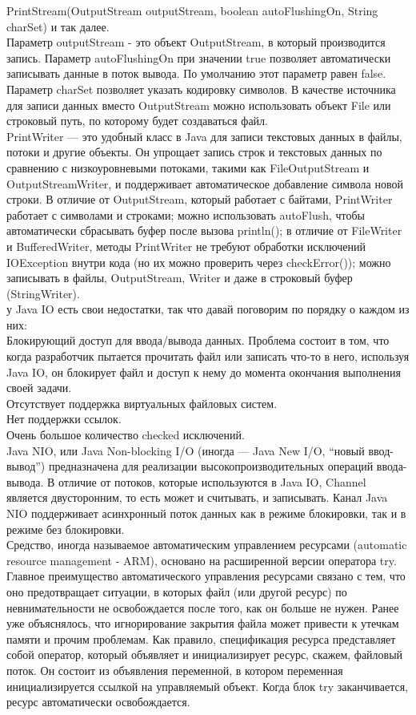 PrintStream(OutputStream outputStream, boolean autoFlushingOn, String charSet) и так далее. \\
Параметр outputStream - это объект OutputStream, в который производится запись. Параметр autoFlushingOn при значении true позволяет автоматически записывать данные в поток вывода. По умолчанию этот параметр равен false. Параметр charSet позволяет указать кодировку символов. В качестве источника для записи данных вместо OutputStream можно использовать объект File или строковый путь, по которому будет создаваться файл. \\
PrintWriter — это удобный класс в Java для записи текстовых данных в файлы, потоки и другие объекты. Он упрощает запись строк и текстовых данных по сравнению с низкоуровневыми потоками, такими как FileOutputStream и OutputStreamWriter, и поддерживает автоматическое добавление символа новой строки. В отличие от OutputStream, который работает с байтами, PrintWriter работает с символами и строками; можно использовать autoFlush, чтобы автоматически сбрасывать буфер после вызова println(); в отличие от FileWriter и BufferedWriter, методы PrintWriter не требуют обработки исключений IOException внутри кода (но их можно проверить через checkError()); можно записывать в файлы, OutputStream, Writer и даже в строковый буфер (StringWriter). \\
у Java IO есть свои недостатки, так что давай поговорим по порядку о каждом из них: \\
Блокирующий доступ для ввода/вывода данных. Проблема состоит в том, что когда разработчик пытается прочитать файл или записать что-то в него, используя Java IO, он блокирует файл и доступ к нему до момента окончания выполнения своей задачи. \\
Отсутствует поддержка виртуальных файловых систем. \\
Нет поддержки ссылок. \\
Очень большое количество checked исключений. \\
Java NIO, или Java Non-blocking I/O (иногда — Java New I/O, “новый ввод-вывод”) предназначена для реализации высокопроизводительных операций ввода-вывода. В отличие от потоков, которые используются в Java IO, Channel является двусторонним, то есть может и считывать, и записывать. Канал Java NIO поддерживает асинхронный поток данных как в режиме блокировки, так и в режиме без блокировки. \\
Средство, иногда называемое автоматическим управлением ресурсами (automatic resource management - ARM), основано на расширенной версии оператора try. Главное преимущество автоматического управления ресурсами связано с тем, что оно предотвращает ситуации, в которых файл (или другой ресурс) по невнимательности не освобождается после того, как он больше не нужен. Ранее уже объяснялось, что игнорирование закрытия файла может привести к утечкам памяти и прочим проблемам. Как правило, спецификация ресурса представляет собой оператор, который объявляет и инициализирует ресурс, скажем, файловый поток. Он состоит из объявления переменной, в котором переменная инициализируется ссылкой на управляемый объект. Когда блок try заканчивается, ресурс автоматически освобождается.



